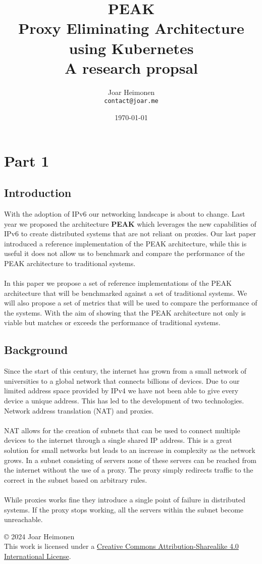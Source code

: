 \documentclass[12pt]{article}
\author{
    Joar Heimonen\\
    \texttt{contact@joar.me}
}
\title{
    \textbf{PEAK}\\[0.5em]
    \large \textbf{P}roxy \textbf{E}liminating \textbf{A}rchitecture using \textbf{K}ubernetes\\[0.3em]
    \large A research propsal
}
\date{\today}
\newcommand{\license}{
    \vspace{1em}
    \noindent\small{© 2024 Joar Heimonen\\
    This work is licensed under a \href{https://creativecommons.org/licenses/by-sa/4.0/}{Creative Commons Attribution-Sharealike 4.0 International License}.}
    \vspace{1em}
}
\begin{document}
\maketitle

\pagebreak

\tableofcontents

\pagebreak


\section{Part 1}
\subsection{Introduction}
With the adoption of IPv6 our networking landscape is about to change. Last year we proposed the architecture \textbf{PEAK} \cite{heimonenPreprintPEAKProxy} which leverages the new capabilities of IPv6
to create distributed systems that are not reliant on proxies.
Our last paper introduced a reference implementation of the PEAK architecture, while this is useful it does not allow us to benchmark and compare the performance of 
the PEAK architecture to traditional systems.
\\
\\
In this paper we propose a set of reference implementations of the PEAK architecture that will be benchmarked against a set of traditional systems.
We will also propose a set of metrics that will be used to compare the performance of the systems.
With the aim of showing that the PEAK architecture not only is viable but matches or exceeds the performance of traditional systems.

\subsection{Background}
Since the start of this century, the internet has grown from a small network of universities to a global network that connects billions of devices. Due to our limited
address space provided by IPv4 \cite{InternetProtocol1981} we have not been able to give every device a unique address. This has led to the development of two technologies. Network address translation (NAT) \cite{holdregeIPNetworkAddress1999} and proxies.
\\
\\
NAT allows for the creation of subnets that can be used to connect multiple devices to the internet through a single shared IP address. This is a great solution for small networks
but leads to an increase in complexity as the network grows. In a subnet consisting of servers none of these servers can be reached from the internet without the use of a proxy.
The proxy simply redirects traffic to the correct in the subnet based on arbitrary rules.
\\
\\
While proxies works fine they introduce a single point of failure in distributed systems. If the proxy stops working, all the servers within the subnet become unreachable.



\printbibliography
\license
\end{document}

